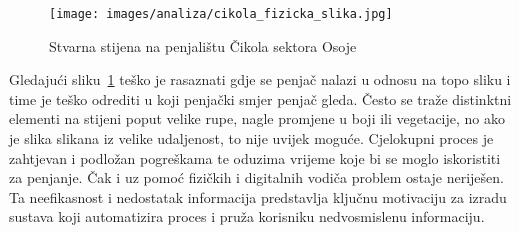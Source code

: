 \begin{figure}[H]
    \centering
    \texttt{[image: images/analiza/cikola\_fizicka\_slika.jpg]}
    \caption{Stvarna stijena na penjalištu Čikola sektora Osoje}
    \label{fig:cikola_fizicka_slika}
\end{figure} 

 Gledajući sliku~\ref{fig:cikola_fizicka_slika} teško je rasaznati gdje se penjač nalazi u odnosu na topo sliku i time je teško odrediti u koji penjački smjer penjač gleda. Često se traže distinktni elementi na stijeni poput velike rupe, nagle promjene u boji ili vegetacije, no ako je slika slikana iz velike udaljenost, to nije uvijek moguće. Cjelokupni proces je zahtjevan i podložan pogreškama te oduzima vrijeme koje bi se moglo iskoristiti za penjanje. Čak i uz pomoć fizičkih i digitalnih vodiča problem ostaje neriješen. Ta neefikasnost i nedostatak informacija predstavlja ključnu motivaciju za izradu sustava koji automatizira proces i pruža korisniku nedvosmislenu informaciju.